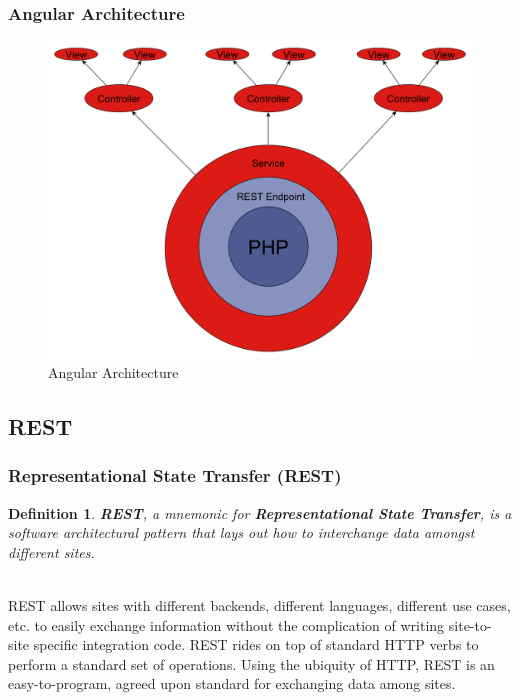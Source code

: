 \documentclass[aspectratio=169]{beamer}
\newtheorem{defn}{Definition}
\begin{document}
\begin{frame}
\frametitle{Angular Architecture}
\begin{figure}
\includegraphics[scale=0.25]{../artifacts/angular-architecture.pdf}
\caption{Angular Architecture}
\label{fig:angular-architecture}
\end{figure}
\end{frame}

\subsection{REST}
\begin{frame}
\frametitle{Representational State Transfer (REST)}
\begin{defn}
\textbf{REST}, a mnemonic for \textbf{Representational State Transfer}, is a software architectural pattern that lays out how to interchange data amongst different sites.
\end{defn}

\mbox{}\\
REST allows sites with different backends, different languages, different use cases, etc. to easily exchange information without the complication of writing site-to-site specific integration code. REST rides on top of standard HTTP verbs to perform a standard set of operations. Using the ubiquity of HTTP, REST is an easy-to-program, agreed upon standard for exchanging data among sites.
\end{frame}
\end{document}
